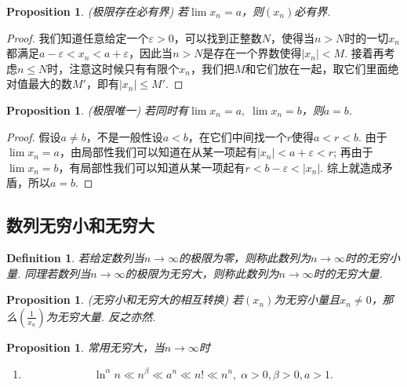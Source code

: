 \documentclass{article}
\newtheorem{proposition}[theorem]{Proposition}
\newtheorem{definition}[theorem]{Definition}
\begin{document}
\begin{proposition}
\rm {\color{red} (极限存在必有界)} 若$\lim x_n = a$，则$(x_n)$必有界.
\end{proposition}

\begin{proof}
我们知道任意给定一个$\varepsilon > 0$，可以找到正整数$N$，使得当$n > N$时的一切$x_n$都满足$ a-\varepsilon < x_n < a + \varepsilon$，因此当$n > N$是存在一个界数使得$|x_n| < M$. 接着再考虑$n \leq N$时，注意这时候只有有限个$x_n$，我们把$M$和它们放在一起，取它们里面绝对值最大的数$M'$，即有$|x_n| \leq M'$.
\end{proof} 

\begin{proposition}
\rm {\color{red} (极限唯一)} 若同时有$\lim x_n = a,\; \lim x_n = b$，则$a = b$.  
\end{proposition}

\begin{proof}
假设$a \neq b$，不是一般性设$a < b$，在它们中间找一个$r$使得$a < r < b$. 由于$\lim x_n = a$，由局部性我们可以知道在从某一项起有$|x_n| < a +\varepsilon < r$; 再由于$\lim x_n = b$，有局部性我们可以知道从某一项起有$r< b- \varepsilon <|x_n|$. 综上就造成矛盾，所以$a = b$.
\end{proof}

\subsection{数列无穷小和无穷大}

\begin{definition}
\rm 若给定数列当$n \rightarrow \infty$的极限为零，则称此数列为$n \rightarrow \infty$时的{\color{red}无穷小量}. 同理若数列当$n \rightarrow \infty $的极限为无穷大，则称此数列为$n \rightarrow \infty$时的{\color{red}无穷大量}.
\end{definition}

\begin{proposition}
\rm {\color{red} (无穷小和无穷大的相互转换)} 若$(x_n)$为无穷小量且$x_n \neq 0$，那么$(\frac{1}{x_n})$为无穷大量. 反之亦然.
\end{proposition}

\begin{proposition}
\rm {\color{red} 常用无穷大}，当$n \rightarrow \infty$时
\begin{enumerate}
	\item 
	$$
	\ln^\alpha n \ll n^\beta \ll a^n \ll n! \ll n^n,\; \alpha > 0,\beta > 0 ,a > 1.
	$$
\end{enumerate}
\end{proposition}
\end{document}
